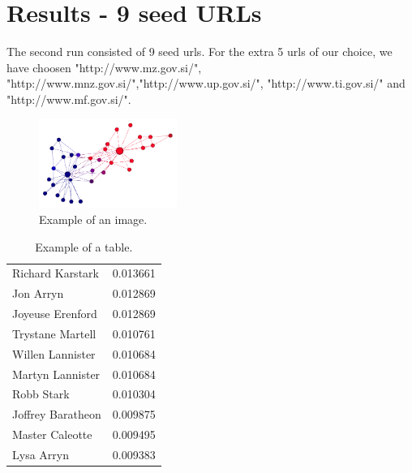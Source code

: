 \documentclass[9pt]{IEEEtran}
\begin{document}
\section{Results - 9 seed URLs}
The second run consisted of 9 seed urls. For the extra 5 urls of our choice, we have choosen "http://www.mz.gov.si/", "http://www.mnz.gov.si/","http://www.up.gov.si/", "http://www.ti.gov.si/" and "http://www.mf.gov.si/". 




\begin{figure}[h] \centering
    \includegraphics[width=0.4\textwidth]{karate.png}
    \caption{{Example of an image.}}
    \label{fig:karate}
\end{figure}


 
\begin{table}
    \begin{center}
    \caption{Example of a table.}
        \begin{tabular}{ l | r }
        
        Richard Karstark & 0.013661 \\
        Jon Arryn & 0.012869 \\
        Joyeuse Erenford & 0.012869 \\
        Trystane Martell & 0.010761 \\
        Willen Lannister & 0.010684 \\
        Martyn Lannister & 0.010684 \\
        Robb Stark & 0.010304 \\
        Joffrey Baratheon & 0.009875 \\
        Master Caleotte & 0.009495 \\
        Lysa Arryn & 0.009383 \\
        \end{tabular}
    \label{tab:pagerankGOT}
    \end{center}
\end{table}





\end{document}
